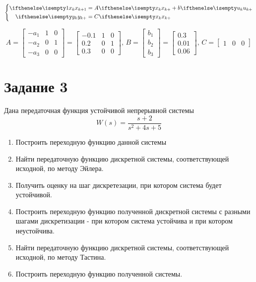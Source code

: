     \begin{equation*}
        \left\{
        \begin{aligned}
            \xk[1] &= A\xk + b\uk\\
            \yk &= C\xk
        \end{aligned}
        \right.
    \end{equation*}

    \begin{equation*}
        A =
        \begin{bmatrix}
            -a_1& 1& 0\\
            -a_2& 0& 1\\
            -a_3& 0& 0
        \end{bmatrix}
        =
        \begin{bmatrix}
            -0.1& 1& 0\\
            0.2& 0& 1\\
            0.3& 0& 0
        \end{bmatrix}
        ,\,B =
        \begin{bmatrix}
            b_1\\
            b_2\\
            b_3
        \end{bmatrix}
        =
        \begin{bmatrix}
            0.3\\
            0.01\\
            0.06
        \end{bmatrix}
        ,\,C =
        \begin{bmatrix}
            1& 0& 0
        \end{bmatrix}
    \end{equation*}

    \section*{Задание 3}
    Дана передаточная функция устойчивой непрерывной системы
    \begin{equation}
        W(s) = \dfrac{s+2}{s^2+4s+5}
    \end{equation}

    \begin{enumerate}
        \item Построить переходную функцию данной системы
        \item Найти передаточную функцию дискретной системы, соответствующей исходной, по методу Эйлера.
        \item Получить оценку на шаг дискретезации, при котором система будет устойчивой.
        \item Построить переходную функцию полученной дискретной системы с разными шагами дискретизации - при котором система устойчива и при котором неустойчива.
        \item Найти передаточную функцию дискретной системы, соответствующей исходной, по методу Тастина.
        \item Построить переходную функцию полученной системы.
    \end{enumerate}

